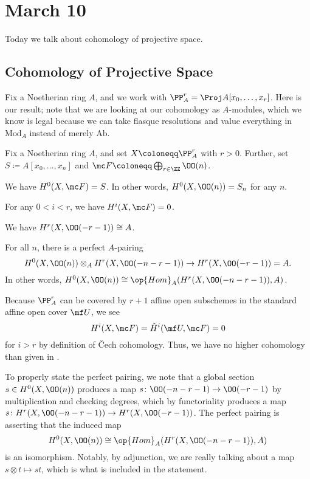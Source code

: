 \documentclass[../notes.tex]{subfiles}
\begin{document}
\section{March 10}

Today we talk about cohomology of projective space.

\subsection{Cohomology of Projective Space}
Fix a Noetherian ring $A$, and we work with $\PP^r_A=\Proj A[x_0,\ldots,x_r]$. Here is our result; note that we are looking at our cohomology as $A$-modules, which we know is legal because we can take flasque resolutions and value everything in $\mathrm{Mod}_A$ instead of merely $\mathrm{Ab}$.
\begin{theorem} \label{thm:proj-cohom}
	Fix a Noetherian ring $A$, and set $X\coloneqq\PP^r_A$ with $r>0$. Further, set $S\coloneqq A[x_0,\ldots,x_n]$ and $\mc F\coloneqq\bigoplus_{r\in\ZZ}\OO(n)$.
	\begin{listalph}
		\item We have $H^0(X,\mc F)=S$. In other words, $H^0(X,\OO(n))=S_n$ for any $n$.
		\item For any $0<i<r$, we have $H^i(X,\mc F)=0$.
		\item We have $H^r(X,\OO(-r-1))\cong A$.
		\item For all $n$, there is a perfect $A$-pairing
		\[H^0(X,\OO(n))\otimes_AH^r(X,\OO(-n-r-1))\to H^r(X,\OO(-r-1))=A.\]
		In other words, $H^0(X,\OO(n))\cong\op{Hom}_A(H^r(X,\OO(-n-r-1)),A)$.
	\end{listalph}
\end{theorem}
\begin{remark}
	Because $\PP^r_A$ can be covered by $r+1$ affine open subschemes in the standard affine open cover $\mf U$, we see
	\[H^i(X,\mc F)=\check H^i(\mf U,\mc F)=0\]
	for $i>r$ by definition of \v Cech cohomology. Thus, we have no higher cohomology than given in .
\end{remark}
\begin{remark}
	To properly state the perfect pairing, we note that a global section $s\in H^0(X,\OO(n))$ produces a map $s\colon\OO(-n-r-1)\to\OO(-r-1)$ by multiplication and checking degrees, which by functoriality produces a map $s\colon H^r(X,\OO(-n-r-1))\to H^r(X,\OO(-r-1))$. The perfect pairing is asserting that the induced map
	\[H^0(X,\OO(n))\cong\op{Hom}_A(H^r(X,\OO(-n-r-1)),A)\]
	is an isomorphism. Notably, by adjunction, we are really talking about a map $s\otimes t\mapsto st$, which is what is included in the statement.
\end{remark}
\end{document}
